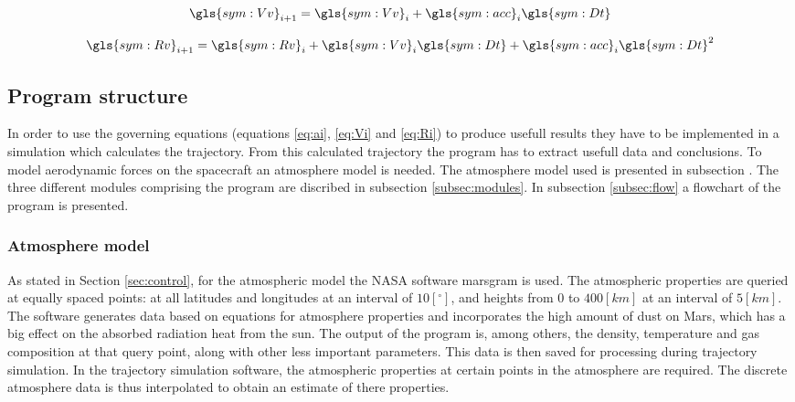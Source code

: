 \begin{equation} \label{eq:Vi}
\gls{sym:Vv}_{i+1} = \gls{sym:Vv}_i + \gls{sym:acc}_i \gls{sym:Dt}
\end{equation}

\begin{equation} \label{eq:Ri}
\gls{sym:Rv}_{i+1} = \gls{sym:Rv}_i + \gls{sym:Vv}_i \gls{sym:Dt} + \gls{sym:acc}_i \gls{sym:Dt}^2
\end{equation}

\subsection{Program structure}\label{sec:prog_struct}

In order to use the governing equations (equations \ref{eq:ai}, \ref{eq:Vi} and \ref{eq:Ri}) to produce usefull results they have to be implemented in a simulation which calculates the trajectory. From this calculated trajectory the program has to extract usefull data and conclusions. To model aerodynamic forces on the spacecraft an atmosphere model is needed. The atmosphere model used is presented in subsection \label{subsec:atmos}. The three different modules comprising the program are discribed in subsection \ref{subsec:modules}. In subsection \ref{subsec:flow} a flowchart of the program is presented.

\subsubsection{Atmosphere model}\label{subsec:atmos}
As stated in Section \ref{sec:control}, for the atmospheric model the NASA software \gls{marsgram} is used. The atmospheric properties are queried at equally spaced points: at all latitudes and longitudes at an interval of $10 [^\circ]$, and heights from $0$ to $400 [km]$ at an interval of $5 [km]$. The software generates data based on equations for atmosphere properties and incorporates the high amount of dust on Mars, which has a big effect on the absorbed radiation heat from the sun. The output of the program is, among others, the density, temperature and gas composition at that query point, along with other less important parameters. \cite{Justus2001}
This data is then saved for processing during trajectory simulation. In the trajectory simulation software, the atmospheric properties at certain points in the atmosphere are required. The discrete atmosphere data is thus interpolated to obtain an estimate of there properties. 

